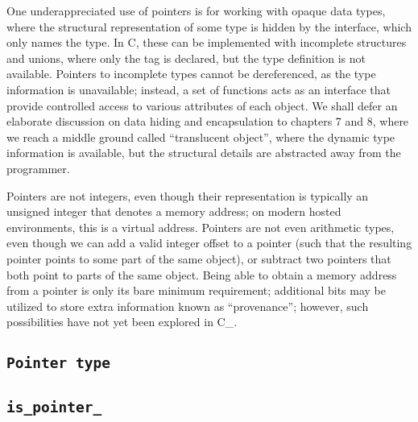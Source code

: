 One underappreciated use of pointers is for working with opaque data types,
where the structural representation of some type is hidden by the interface,
which only names the type.
In C, these can be implemented with incomplete structures and unions,
where only the tag is declared, but the type definition is not available.
Pointers to incomplete types cannot be dereferenced,
as the type information is unavailable; instead, a set of functions acts as an
interface that provide controlled access to various attributes of each object.
We shall defer an elaborate discussion on data hiding and encapsulation to
chapters 7 and 8, where we reach a middle ground called ``translucent object'',
where the dynamic type information is available,
but the structural details are abstracted away from the programmer.

\note Pointers are not integers, even though their representation
is typically an unsigned integer that denotes a memory address;
on modern hosted environments, this is a virtual address.
Pointers are not even arithmetic types,
even though we can add a valid integer offset to a pointer
(such that the resulting pointer points to some part of the same object),
or subtract two pointers that both point to parts of the same object.
Being able to obtain a memory address from a pointer is only its bare minimum
requirement; additional bits may be utilized to store extra information known as
``provenance''; however, such possibilities have not yet been explored in C\_.


\subsection{\tt{Pointer} type}


\subsection{\tt{is_pointer_}}




